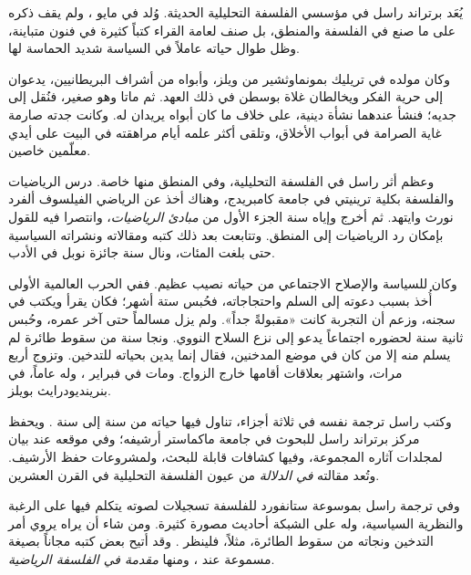 \documentclass[../../../include/open-logic-section]{subfiles}
\begin{document}



يُعَد برتراند راسل في مؤسسي الفلسفة التحليلية الحديثة. وُلد في  مايو
، ولم يقف ذكره على ما صنع في الفلسفة والمنطق، بل صنف لعامة القراء
كتباً كثيرة في فنون متباينة، وظل طوال حياته عاملاً في السياسة شديد الحماسة
لها.

وكان مولده في تريليك بمونماوثشير من ويلز، وأبواه من أشراف البريطانيين،
يدعوان إلى حرية الفكر ويخالطان غلاة بوسطن في ذلك العهد. ثم ماتا وهو صغير،
فنُقل إلى جديه؛ فنشأ عندهما نشأة دينية، على خلاف ما كان أبواه يريدان له.
وكانت جدته صارمة غاية الصرامة في أبواب الأخلاق، وتلقى أكثر علمه أيام
مراهقته في البيت على أيدي معلّمين خاصين.

وعظم أثر راسل في الفلسفة التحليلية، وفي المنطق منها خاصة. درس الرياضيات
والفلسفة بكلية ترينيتي في جامعة كامبريدج، وهناك أخذ عن الرياضي الفيلسوف
ألفرد نورث وايتهد. ثم أخرج وإياه سنة  الجزء الأول من \emph{مبادئ
الرياضيات}، وانتصرا فيه للقول بإمكان رد الرياضيات إلى المنطق. وتتابعت بعد
ذلك كتبه ومقالاته ونشراته السياسية حتى بلغت المئات، ونال سنة  جائزة
نوبل في الأدب.

وكان للسياسة والإصلاح الاجتماعي من حياته نصيب عظيم. ففي الحرب العالمية
الأولى أُخذ بسبب دعوته إلى السلم واحتجاجاته، فحُبس ستة أشهر؛ فكان يقرأ
ويكتب في سجنه، وزعم أن التجربة كانت «مقبولةً جداً». ولم يزل مسالماً حتى
آخر عمره، وحُبس ثانية سنة  لحضوره اجتماعاً يدعو إلى نزع السلاح النووي.
ونجا سنة  من سقوط طائرة لم يسلم منه إلا من كان في موضع المدخنين، فقال
إنما يدين بحياته للتدخين. وتزوج أربع مرات، واشتهر بعلاقات أقامها خارج
الزواج. ومات في  فبراير ، وله  عاماً، في بنرينديودرايث بويلز.

\begin{reading}
وكتب راسل ترجمة نفسه في ثلاثة أجزاء، تناول فيها حياته من سنة  إلى سنة
 \citep{Russell1967,Russell1968,Russell1969}. ويحفظ مركز برتراند
راسل للبحوث في جامعة ماكماستر أرشيفه؛ وفي موقعه عند \citet{Duncan2015}
بيان لمجلدات آثاره المجموعة، وفيها كشافات قابلة للبحث، ولمشروعات حفظ
الأرشيف. وتُعد مقالته \emph{في الدلالة} \citep{Russell1905} من عيون
الفلسفة التحليلية في القرن العشرين.

وفي ترجمة راسل بموسوعة ستانفورد للفلسفة \citep{Irvine2015} تسجيلات لصوته
يتكلم فيها على الرغبة والنظرية السياسية، وله على الشبكة أحاديث مصورة
كثيرة. ومن شاء أن يراه يروي أمر التدخين ونجاته من سقوط الطائرة، مثلاً،
فلينظر \citet{RussellND}. وقد أتيح بعض كتبه مجاناً بصيغة مسموعة عند
\citet{LibriVoxND}، ومنها \emph{مقدمة في الفلسفة الرياضية}.
\end{reading}
\end{document}
